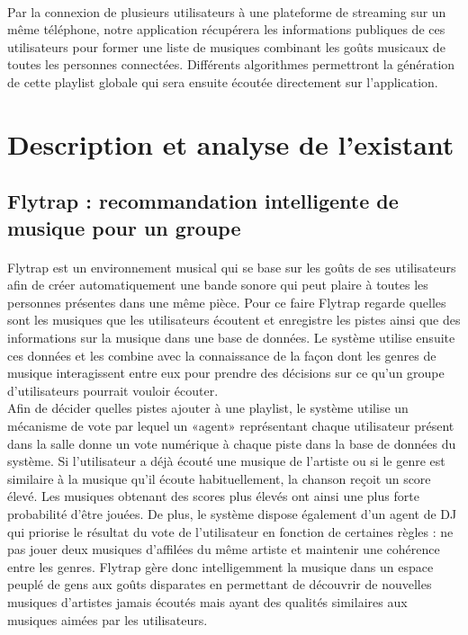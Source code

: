 \documentclass[12pt, openany]{report}
\begin{document}
\paragraph{}Par la connexion de plusieurs utilisateurs à une plateforme de streaming sur un même téléphone, notre application récupérera les informations publiques de ces utilisateurs pour former une liste de musiques combinant les goûts musicaux de toutes les personnes connectées. Différents algorithmes permettront la génération de cette playlist globale qui sera ensuite écoutée directement sur l'application.

\section{Description et analyse de l'existant}

\subsection{Flytrap : recommandation intelligente de musique pour un groupe}

\paragraph{}Flytrap \cite {Flytrap} est un environnement musical qui se base sur les goûts de ses utilisateurs afin de  créer automatiquement une bande sonore qui peut plaire à toutes les personnes présentes dans une même pièce. Pour ce faire Flytrap regarde quelles sont les musiques que les utilisateurs écoutent et enregistre les pistes ainsi que des informations sur la musique dans une base de données. Le système utilise ensuite ces données et les combine avec la connaissance de la façon dont les genres de musique interagissent  entre eux pour prendre des décisions sur ce qu’un groupe d’utilisateurs pourrait vouloir écouter. \\
Afin de décider quelles pistes ajouter à une playlist, le système utilise un mécanisme de vote par lequel un «agent» représentant chaque utilisateur présent dans la salle donne un vote numérique à chaque piste dans la base de données du système. Si l’utilisateur a déjà écouté une musique de l’artiste ou si le genre est similaire à la musique qu’il écoute habituellement, la chanson reçoit un score élevé. Les musiques obtenant des scores plus élevés ont ainsi une plus forte probabilité d’être jouées. De plus, le système dispose également d’un agent de DJ qui priorise le résultat du vote de l’utilisateur en fonction de certaines règles : ne pas jouer deux musiques d’affilées du même artiste et maintenir une cohérence entre les genres. Flytrap gère donc intelligemment la musique dans un espace peuplé de gens aux goûts disparates en permettant de découvrir de nouvelles musiques d’artistes jamais écoutés mais ayant des qualités similaires aux musiques aimées par les utilisateurs.
\end{document}
